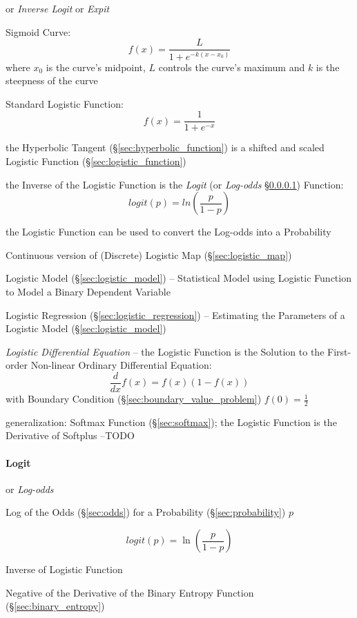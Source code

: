 
or \emph{Inverse Logit} or \emph{Expit}

Sigmoid Curve:
\[
  f(x) = \frac{L}{1 + e^{-k(x-x_0)}}
\]
where $x_0$ is the curve's midpoint, $L$ controls the curve's maximum and $k$ is
the steepness of the curve

Standard Logistic Function:
\[
  f(x) = \frac{1}{1 + e^{-x}}
\]

the Hyperbolic Tangent (\S\ref{sec:hyperbolic_function}) is a shifted and scaled
Logistic Function (\S\ref{sec:logistic_function})

the Inverse of the Logistic Function is the \emph{Logit} (or \emph{Log-odds}
\S\ref{sec:logit}) Function:
\[
  logit(p) = ln (\frac{p}{1-p})
\]

the Logistic Function can be used to convert the Log-odds into a Probability

\fist Continuous version of (Discrete) Logistic Map (\S\ref{sec:logistic_map})

\fist Logistic Model (\S\ref{sec:logistic_model}) -- Statistical Model using
Logistic Function to Model a Binary Dependent Variable

\fist Logistic Regression (\S\ref{sec:logistic_regression}) -- Estimating the
Parameters of a Logistic Model (\S\ref{sec:logistic_model})

\emph{Logistic Differential Equation} -- the Logistic Function is the Solution
to the First-order Non-linear Ordinary Differential Equation:
\[
  \frac{d}{dx}f(x) = f(x)(1 - f(x))
\]
with Boundary Condition (\S\ref{sec:boundary_value_problem}) $f(0) =
\frac{1}{2}$

\fist generalization: Softmax Function (\S\ref{sec:softmax}); the Logistic
Function is the Derivative of Softplus --TODO



\paragraph{Logit}\label{sec:logit}\hfill

or \emph{Log-odds}

Log of the Odds (\S\ref{sec:odds}) for a Probability (\S\ref{sec:probability})
$p$

\[
  logit(p) = \ln (\frac{p}{1-p})
\]

Inverse of Logistic Function

Negative of the Derivative of the Binary Entropy Function
(\S\ref{sec:binary_entropy})

